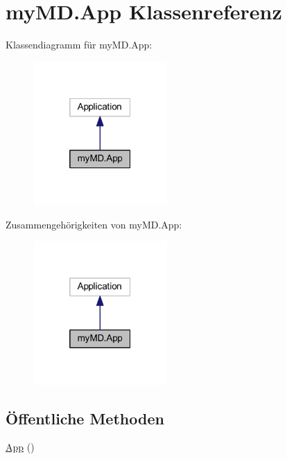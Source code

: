 \hypertarget{classmy_m_d_1_1_app}{}\section{my\+M\+D.\+App Klassenreferenz}
\label{classmy_m_d_1_1_app}


Klassendiagramm für my\+M\+D.\+App\+:\nopagebreak
\begin{figure}[H]
\begin{center}
\leavevmode
\includegraphics[width=145pt]{classmy_m_d_1_1_app__inherit__graph}
\end{center}
\end{figure}


Zusammengehörigkeiten von my\+M\+D.\+App\+:\nopagebreak
\begin{figure}[H]
\begin{center}
\leavevmode
\includegraphics[width=145pt]{classmy_m_d_1_1_app__coll__graph}
\end{center}
\end{figure}
\subsection*{Öffentliche Methoden}
\begin{DoxyCompactItemize}
\item 
\mbox{\hyperlink{classmy_m_d_1_1_app_aade00a34203636478b102999b7bb5c51}{App}} ()
\end{DoxyCompactItemize}
